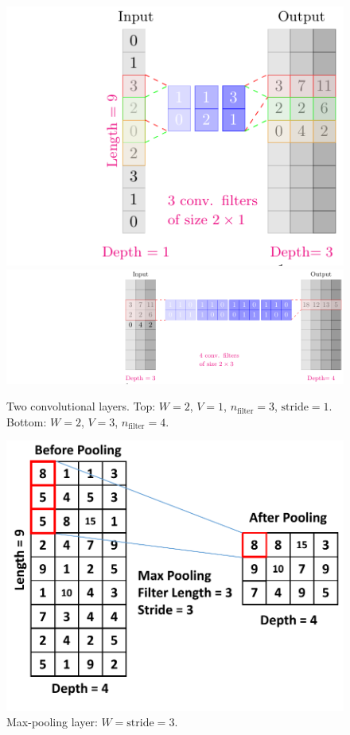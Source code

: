 \begin{figure}
\includegraphics[scale=1, center]{../tikz_per_manuscritto/conv_filter_2_1.pdf} \\
\includegraphics[scale=1, right]{../tikz_per_manuscritto/conv_filter_2_3.pdf} 

\caption[Convolutional layer.]{Two convolutional layers. Top: $W=2$, $V=1$, $n_{\text{filter}}=3$, $\mathrm{stride}=1$. Bottom: $W=2$, $V=3$, $n_{\text{filter}}=4$. }\label{fig:conv_layer}
\end{figure}

\begin{figure}[t]
\centering
\includegraphics[width=.4\textwidth]{../Figures/CHES2017/max_pooling.pdf}
\caption[Max-pooling layer.]{Max-pooling layer: $W = \mathrm{stride} = 3$. }\label{fig:pool_layer}
\end{figure}


